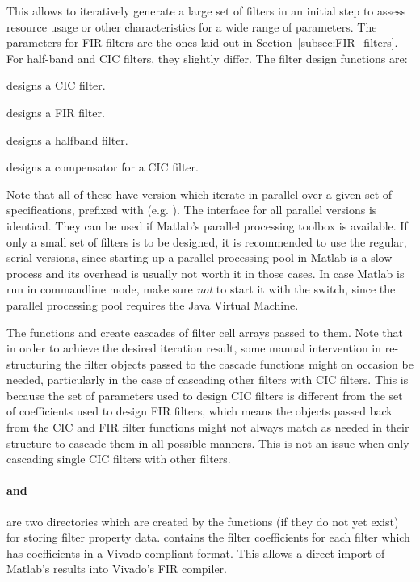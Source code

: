 This  allows to  iteratively generate  a large  set of  filters in  an initial
step  to assess  resource  usage or  other characteristics  for  a wide  range
of  parameters. The parameters  for  FIR  filters are  the  ones  laid out  in
Section~\ref{subsec:FIR_filters}. For half-band and CIC filters, they slightly
differ.  The filter design functions are:
\begin{description}\tightlist
    \item[\code{decCIC.m}] designs a CIC filter.
    \item[\code{decFIR.m}] designs a FIR filter.
    \item[\code{halfbandFIR.m}] designs a halfband filter.
    \item[\code{compCIC.m}] designs a compensator for a CIC filter.
\end{description}
Note that all of these have version which iterate in parallel over a given set
of  specifications,  prefixed  with    (e.g.  ). The
interface for all parallel versions is identical. They can be used if Matlab's
parallel processing toolbox is available. If only a small set of filters is to
be designed,  it is  recommended to  use the  regular, serial  versions, since
starting up  a parallel processing  pool in Matlab is  a slow process  and its
overhead is  usually not  worth it in  those cases. In case  Matlab is  run in
commandline  mode, make  sure \emph{not}  to start  it with  the 
switch, since the parallel processing pool requires the Java Virtual Machine.

The functions   and   create  cascades of
filter cell arrays  passed to them. Note that in order  to achieve the desired
iteration  result,  some  manual  intervention in  re-structuring  the  filter
objects  passed  to  the  cascade  functions  might  on  occasion  be  needed,
particularly in the case of cascading  other filters with CIC filters. This is
because the set of parameters used to design CIC filters is different from the
set of coefficients used to design FIR filters, which means the objects passed
back from the CIC and FIR filter functions might not always match as needed in
their structure to cascade them in  all possible manners. This is not an issue
when only cascading single CIC filters with other filters.

\paragraph{ and } are  two directories which are
created  by the  functions  (if they  do  not yet  exist)  for storing  filter
property  data.   contains  the  filter  coefficients for  each
filter which  has coefficients in a  Vivado-compliant  format. This
allows a direct import of Matlab's results into Vivado's FIR compiler.

